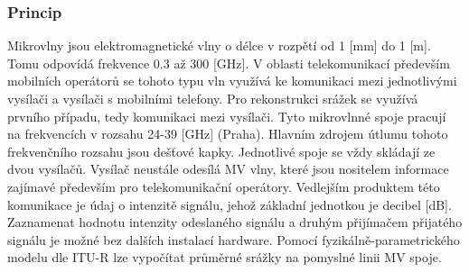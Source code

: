 \documentclass[a4paper,12pt,oneside]{report}
\begin{document}
    
\subsubsection{Princip}
Mikrovlny jsou elektromagnetické vlny o délce v rozpětí od 1 [mm] do 1 [m]. Tomu odpovídá frekvence 0.3  až 300 [GHz]. V oblasti telekomunikací především mobilních operátorů se tohoto typu vln využívá ke komunikaci mezi jednotlivými vysílači a vysílači s mobilními telefony. Pro rekonstrukci srážek se využívá prvního případu, tedy komunikaci mezi vysílači. Tyto mikrovlnné spoje pracují na frekvencích v rozsahu 24-39 [GHz] (Praha). Hlavním zdrojem útlumu tohoto frekvenčního rozsahu jsou dešťové kapky. Jednotlivé spoje se vždy skládají ze dvou vysílačů. Vysílač neustále odesílá MV vlny, které jsou nositelem informace zajímavé především pro telekomunikační operátory. Vedlejším produktem této komunikace je údaj o intenzitě signálu, jehož základní jednotkou je decibel [dB]. Zaznamenat hodnotu intenzity odeslaného signálu  a druhým přijímačem přijatého signálu je možné bez dalších instalací hardware. Pomocí fyzikálně-parametrického modelu dle ITU-R\cite{itu} lze vypočítat průměrné srážky na pomyslné linii MV spoje.
\end{document}
